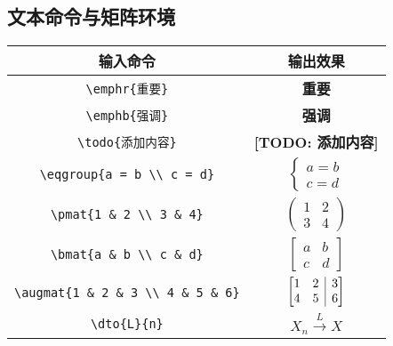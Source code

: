\documentclass[12pt,a4paper]{ctexart}
\makeatletter
\newcommand{\dto}[2]{\overset{#1}{\rightarrow} #2}
\newcommand{\emphr}[1]{\textbf{\color{red}#1}} %
\newcommand{\emphb}[1]{\textbf{#1}} %
\newcommand{\todo}[1]{\textbf{\color{blue}[TODO: #1]}} %
\newcommand{\eqgroup}[1]{%
	\begin{cases}
		#1
	\end{cases}
}
\newcommand{\pmat}[1]{%
	\begin{pmatrix}
		#1
	\end{pmatrix}
}
\newcommand{\bmat}[1]{%
	\begin{bmatrix}
		#1
	\end{bmatrix}
}
\newcommand{\augmat}[1]{%
	\left[\begin{array}{@{}cc|c@{}}  %
		#1
	\end{array}\right]
}
\makeatother
\begin{document}
\subsection*{文本命令与矩阵环境}
\begin{center}
	\begin{tabular}{|c|c|}
		\hline
		输入命令 & 输出效果 \\
		\hline
		\verb|\emphr{重要}| & \emphr{重要} \\
		\verb|\emphb{强调}| & \emphb{强调} \\
		\verb|\todo{添加内容}| & \todo{添加内容} \\
		\verb|\eqgroup{a = b \\ c = d}| & $\eqgroup{a = b \\ c = d}$ \\
		\verb|\pmat{1 & 2 \\ 3 & 4}| & $\pmat{1 & 2 \\ 3 & 4}$ \\
		\verb|\bmat{a & b \\ c & d}| & $\bmat{a & b \\ c & d}$ \\
		\verb|\augmat{1 & 2 & 3 \\ 4 & 5 & 6}| & $\augmat{1 & 2 & 3 \\ 4 & 5 & 6}$ \\
		\verb|\dto{L}{n}| & $X_n \dto{L} X$ \\
		\hline
	\end{tabular}
\end{center}
\end{document}
